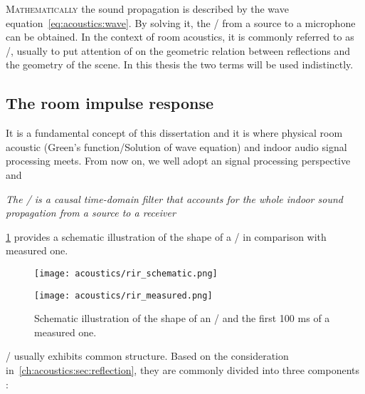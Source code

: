\textsc{Mathematically} the sound propagation is described by the wave equation~\eqref{eq:acoustics:wave}.
By solving it, the \AIRdef/
from a source to a microphone can be obtained.
In the context of room acoustics, it is commonly referred to as \RIRdef/, usually to put attention of
on the geometric relation between reflections and the geometry of the scene.
In this thesis the two terms will be used indistinctly.

\subsection{The room impulse response}\label{ch:acoustics:subsec:rir}
It is a fundamental concept of this dissertation and it is where physical room acoustic
(Green's function/Solution of wave equation) and indoor audio signal processing meets.
From now on, we well adopt an signal processing perspective and
\begin{center}
\textit{The \RIR/ is a causal time-domain filter that accounts for the whole indoor sound propagation
from a source to a receiver}
\end{center}
\cref{fig:acoustics:rir} provides a schematic illustration of the shape of a \RIR/ in comparison with measured one.
\begin{figure}[h]
    \centering
    \begin{minipage}[b]{.5\textwidth}
        \centering
        \texttt{[image: acoustics/rir\_schematic.png]}
    \end{minipage}%
    \begin{minipage}[b]{.5\textwidth}
        \centering
        \texttt{[image: acoustics/rir\_measured.png]}
    \end{minipage}
    \caption{Schematic illustration of the shape of an \RIR/ and the first 100 ms of a measured one.}
    \label{fig:acoustics:rir}
\end{figure}

\RIRs/ usually exhibits common structure.
Based on the consideration in~\cref{ch:acoustics:sec:reflection},
they are commonly divided into three components :

